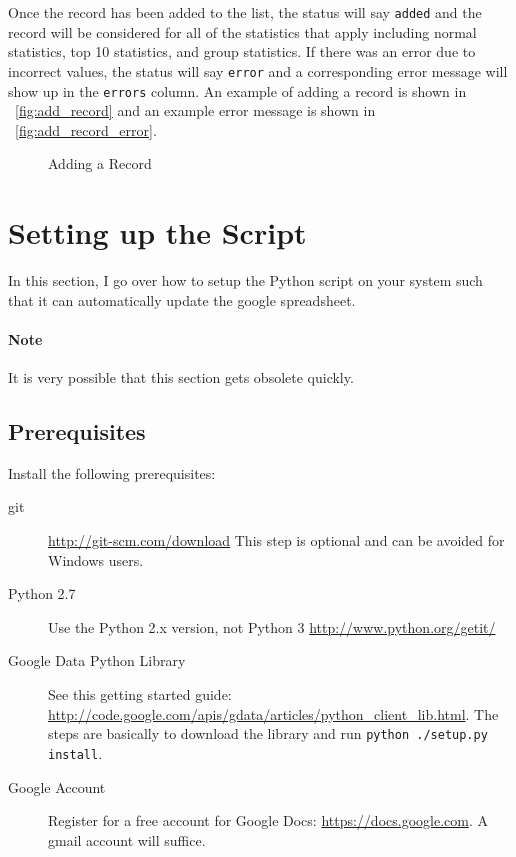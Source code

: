 Once the record has been added to the list, the status will say \texttt{added} and the record will be considered for all of the statistics that apply including normal statistics, top 10 statistics, and group statistics. If there was an error due to incorrect values, the status will say \texttt{error} and a corresponding error message will show up in the \texttt{errors} column. An example of adding a record is shown in \figurename\ \ref{fig:add_record} and an example error message is shown in \figurename\ \ref{fig:add_record_error}.
\begin{figure}[htb!]
\centering
{}
\caption{Adding a Record}
\end{figure}

\section{Setting up the Script}
In this section, I go over how to setup the Python script on your system such that it can automatically update the google spreadsheet.
\paragraph{Note}
It is very possible that this section gets obsolete quickly.
\subsection{Prerequisites}
Install the following prerequisites:
\begin{description}
\item[git] \url{http://git-scm.com/download} This step is optional and can be avoided for Windows users.
\item[Python 2.7] Use the Python 2.x version, not Python 3 \url{http://www.python.org/getit/}
\item[Google Data Python Library] See this getting started guide: \url{http://code.google.com/apis/gdata/articles/python_client_lib.html}. The steps are basically to download the library and run \texttt{python ./setup.py install}.
\item[Google Account] Register for a free account for Google Docs: \url{https://docs.google.com}. A gmail account will suffice.
\end{description}

